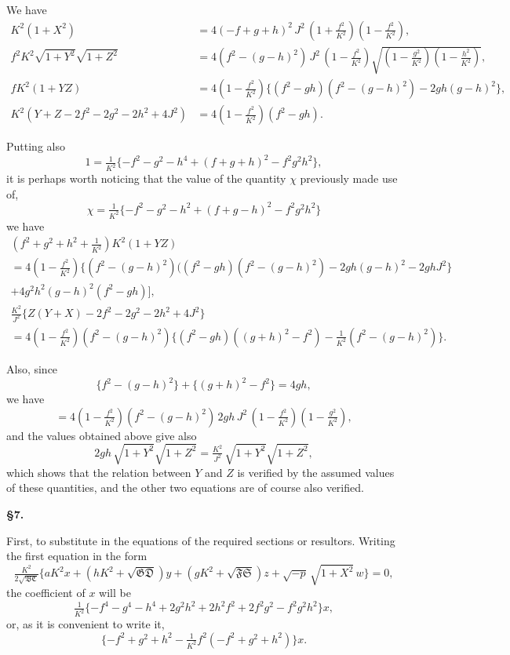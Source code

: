 \documentclass[11pt,a4paper]{book}
\begin{document}
\newpage
\setcounter{page}{78}

We have
\begin{align*}
K^2(1+X^2) &= 4(-f+g+h)^2\,J^2\,(1+\tfrac{f^2}{K^2})(1-\tfrac{f^2}{K^2}),\\
f^2K^2\sqrt{1+Y^2}\sqrt{1+Z^2} &= 4(f^2-(g-h)^2)\,J^2\,(1-\tfrac{f^2}{K^2})\sqrt{(1-\tfrac{g^2}{K^2})(1-\tfrac{h^2}{K^2})},\\
fK^2(1+YZ) &= 4(1-\tfrac{f^2}{K^2})\{(f^2-gh)(f^2-(g-h)^2)-2gh(g-h)^2\},\\
K^2(Y+Z-2f^2-2g^2-2h^2+4J^2) &= 4(1-\tfrac{f^2}{K^2})(f^2-gh).
\end{align*}

Putting also
\[
1 = \tfrac{1}{K^2}\{-f^2-g^2-h^4+(f+g+h)^2-f^2g^2h^2\},
\]
it is perhaps worth noticing that the value of the quantity $\chi$ previously made use of,
\[
\chi = \tfrac{1}{K^2}\{-f^2-g^2-h^2+(f+g-h)^2-f^2g^2h^2\}
\]
we have
\begin{multline*}
(f^2+g^2+h^2+\tfrac{1}{K^2})K^2(1+YZ)\\
= 4(1-\tfrac{f^2}{K^2})\{(f^2-(g-h)^2)((f^2-gh)(f^2-(g-h)^2)-2gh(g-h)^2-2ghJ^2\}\\
+ 4g^2h^2(g-h)^2(f^2-gh)\big],
\end{multline*}
\begin{multline*}
\tfrac{K^2}{J^2}\{Z(Y+X)-2f^2-2g^2-2h^2+4J^2\}\\
= 4(1-\tfrac{f^2}{K^2})(f^2-(g-h)^2)\{(f^2-gh)((g+h)^2-f^2)-\tfrac{1}{K^2}(f^2-(g-h)^2)\}.
\end{multline*}

Also, since
\[
\{f^2-(g-h)^2\} + \{(g+h)^2-f^2\} = 4gh,
\]
we have
\[
= 4(1-\tfrac{f^2}{K^2})(f^2-(g-h)^2)\,2gh\,J^2\,(1-\tfrac{f^2}{K^2})(1-\tfrac{g^2}{K^2}),
\]
and the values obtained above give also
\[
2gh\,\sqrt{1+Y^2}\sqrt{1+Z^2} = \tfrac{K^2}{J^2}\,\sqrt{1+Y^2}\sqrt{1+Z^2},
\]
which shows that the relation between $Y$ and $Z$ is verified by the assumed values of these quantities, and the other two equations are of course also verified.


\newpage
\setcounter{page}{79}

\noindent\textbf{\S 7.}

First, to substitute in the equations of the required sections or resultors. Writing the first equation in the form
\[
\tfrac{K^2}{2\sqrt{\mathfrak{B}\mathfrak{C}}}\{aK^2x + (hK^2+\sqrt{\mathfrak{G}\mathfrak{D}})y + (gK^2+\sqrt{\mathfrak{F}\mathfrak{S}})z + \sqrt{-p}\,\sqrt{1+X^2}\,w\} = 0,
\]
the coefficient of $x$ will be
\[
\tfrac{1}{K^2}\{-f^4-g^4-h^4+2g^2h^2+2h^2f^2+2f^2g^2-f^2g^2h^2\}x,
\]
or, as it is convenient to write it,
\[
\{-f^2+g^2+h^2-\tfrac{1}{K^2}f^2(-f^2+g^2+h^2)\}x.
\]
\end{document}
